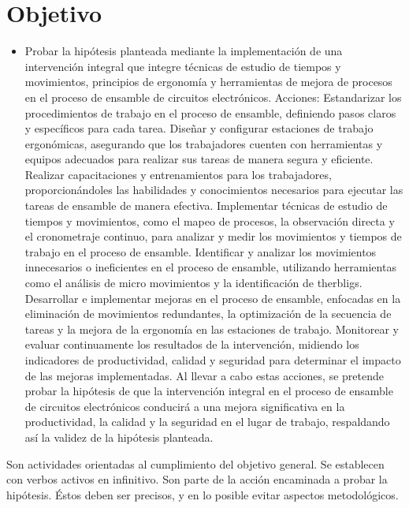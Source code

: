     \section{Objetivo}
    \begin{itemize}
        \item Probar la hipótesis planteada mediante la implementación de una intervención integral que integre técnicas de estudio de tiempos y movimientos, principios de ergonomía y herramientas de mejora de procesos en el proceso de ensamble de circuitos electrónicos.
    Acciones:
    Estandarizar los procedimientos de trabajo en el proceso de ensamble, definiendo pasos claros y específicos para cada tarea.
    Diseñar y configurar estaciones de trabajo ergonómicas, asegurando que los trabajadores cuenten con herramientas y equipos adecuados para realizar sus tareas de manera segura y eficiente.
    Realizar capacitaciones y entrenamientos para los trabajadores, proporcionándoles las habilidades y conocimientos necesarios para ejecutar las tareas de ensamble de manera efectiva.
    Implementar técnicas de estudio de tiempos y movimientos, como el mapeo de procesos, la observación directa y el cronometraje continuo, para analizar y medir los movimientos y tiempos de trabajo en el proceso de ensamble.
    Identificar y analizar los movimientos innecesarios o ineficientes en el proceso de ensamble, utilizando herramientas como el análisis de micro movimientos y la identificación de therbligs.
    Desarrollar e implementar mejoras en el proceso de ensamble, enfocadas en la eliminación de movimientos redundantes, la optimización de la secuencia de tareas y la mejora de la ergonomía en las estaciones de trabajo.
    Monitorear y evaluar continuamente los resultados de la intervención, midiendo los indicadores de productividad, calidad y seguridad para determinar el impacto de las mejoras implementadas.
    Al llevar a cabo estas acciones, se pretende probar la hipótesis de que la intervención integral en el proceso de ensamble de circuitos electrónicos conducirá a una mejora significativa en la productividad, la calidad y la seguridad en el lugar de trabajo, respaldando así la validez de la hipótesis planteada.
    
    \end{itemize}
    
    Son actividades orientadas al cumplimiento del objetivo general. Se establecen con verbos activos en infinitivo. Son parte de la acción encaminada a probar la hipótesis. Éstos deben ser precisos, y en lo posible evitar aspectos metodológicos.
